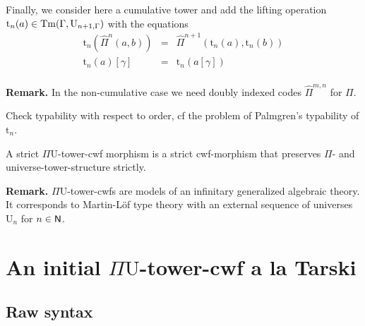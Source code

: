 \documentclass{lmcs}
\def\UU{\mathrm{U}}
\def\Pihat{\hat{\Pi}}
\def\t{\mathrm{t}}
\begin{document}
Finally, we consider here a cumulative tower and add the lifting operation $\t_n(a) \in \Tm(\Gamma,\UU_{n+1,\Gamma})$ with the equations
\begin{eqnarray*}
\t_n(\Pihat^n(a,b)) &= &\Pihat^{n+1}(\t_n(a),\t_n(b))\\
\t_n(a)[\gamma] &=& \t_n(a[\gamma])\\
\end{eqnarray*}

{\bf Remark.} In the non-cumulative case we need doubly indexed codes $\Pihat^{m,n}$ for $\Pi$.

Check typability with respect to order, cf the problem of Palmgren's typability of $\t_n$.

A strict $\Pi\UU$-tower-cwf morphism is a strict cwf-morphism that preserves $\Pi$- and universe-tower-structure strictly.

{\bf Remark.} $\Pi\UU$-tower-cwfs are models of an infinitary generalized algebraic theory. It corresponds to Martin-Löf type theory with an external sequence of universes $\UU_n$ for $n \in \mathsf{N}$.

\section{An initial $\Pi\UU$-tower-cwf a la Tarski}
\label{sec:syntax}

\subsection{Raw syntax}\label{sec:grammar}
\end{document}
